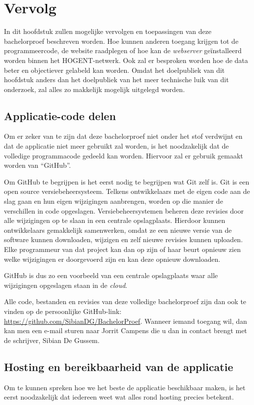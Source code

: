 \chapter{Vervolg}
\label{ch:vervolg}

In dit hoofdstuk zullen mogelijke vervolgen en toepassingen van deze bachelorproef beschreven worden. Hoe kunnen anderen toegang krijgen tot de programmeercode, de website raadplegen of hoe kan de \textit{webserver} geïnstalleerd worden binnen het HOGENT-netwerk. Ook zal er besproken worden hoe de data beter en objectiever gelabeld kan worden. Omdat het doelpubliek van dit hoofdstuk anders dan het doelpubliek van het meer technische luik van dit onderzoek, zal alles zo makkelijk mogelijk uitgelegd worden.

\section{Applicatie-code delen}
Om er zeker van te zijn dat deze bachelorproef niet onder het stof verdwijnt en dat de applicatie niet meer gebruikt zal worden, is het noodzakelijk dat de volledige programmacode gedeeld kan worden. Hiervoor zal er gebruik gemaakt worden van ``GitHub''.

Om GitHub te begrijpen is het eerst nodig te begrijpen wat Git zelf is. Git is een open source versiebeheersysteem. Telkens ontwikkelaars met de eigen code aan de slag gaan en hun eigen wijzigingen aanbrengen, worden op die manier de verschillen in code opgeslagen. Versiebeheersystemen beheren deze revisies door alle wijzigingen op te slaan in een centrale opslagplaats. Hierdoor kunnen ontwikkelaars gemakkelijk samenwerken, omdat ze een nieuwe versie van de software kunnen downloaden, wijzigen en zelf nieuwe revisies kunnen uploaden. Elke programmeur van dat project kan dan op zijn of haar beurt opnieuw zien welke wijzigingen er doorgevoerd zijn en kan deze opnieuw downloaden.~\autocite{Brown2019}

GitHub is dus zo een voorbeeld van een centrale opslagplaats waar alle wijzigingen opgeslagen staan in de \textit{cloud}.

Alle code, bestanden en revisies van deze volledige bachelorproef zijn dan ook te vinden op de persoonlijke GitHub-link: \url{https://github.com/SibianDG/BachelorProef}. Wanneer iemand toegang wil, dan kan men een e-mail sturen naar Jorrit Campens die u dan in contact brengt met de schrijver, Sibian De Gussem.

\section{Hosting en bereikbaarheid van de applicatie}
Om te kunnen spreken hoe we het beste de applicatie beschikbaar maken, is het eerst noodzakelijk dat iedereen weet wat alles rond hosting precies betekent.

